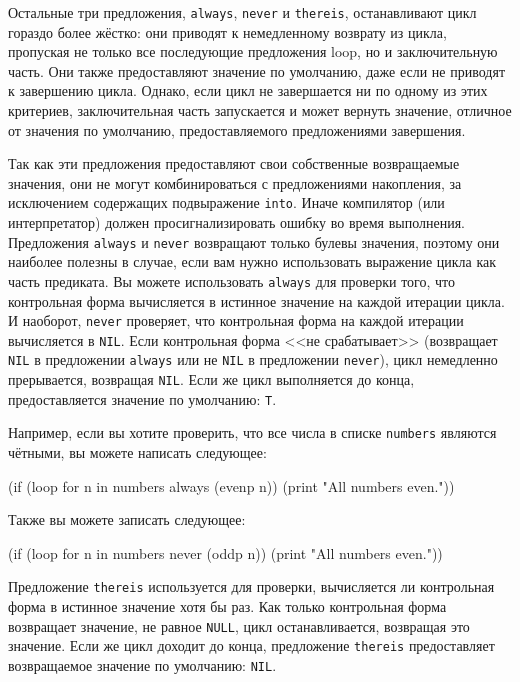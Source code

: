 Остальные три предложения, \lstinline{always}, \lstinline{never} и \lstinline{thereis}, останавливают
цикл гораздо более жёстко: они приводят к немедленному возврату из цикла, пропуская не
только все последующие предложения loop, но и заключительную часть. Они также
предоставляют значение по умолчанию, даже если не приводят к завершению цикла. Однако, если
цикл не завершается ни по одному из этих критериев, заключительная часть запускается и
может вернуть значение, отличное от значения по умолчанию, предоставляемого предложениями
завершения.

Так как эти предложения предоставляют свои собственные возвращаемые значения, они не могут
комбинироваться с предложениями накопления, за исключением содержащих подвыражение
\lstinline{into}. Иначе компилятор (или интерпретатор) должен просигнализировать ошибку во
время выполнения. Предложения \lstinline{always} и \lstinline{never} возвращают только булевы
значения, поэтому они наиболее полезны в случае, если вам нужно использовать выражение
цикла как часть предиката. Вы можете использовать \lstinline{always} для проверки того, что
контрольная форма вычисляется в истинное значение на каждой итерации цикла. И наоборот,
\lstinline{never} проверяет, что контрольная форма на каждой итерации вычисляется в
\lstinline{NIL}. Если контрольная форма <<не срабатывает>> (возвращает \lstinline{NIL} в
предложении \lstinline{always} или не \lstinline{NIL} в предложении \lstinline{never}), цикл немедленно
прерывается, возвращая \lstinline{NIL}. Если же цикл выполняется до конца, предоставляется
значение по умолчанию: \lstinline{T}.

Например, если вы хотите проверить, что все числа в списке \lstinline{numbers} являются
чётными, вы можете написать следующее:

\begin{myverb}
(if (loop for n in numbers always (evenp n))
    (print "All numbers even."))
\end{myverb}

Также вы можете записать следующее:

\begin{myverb}
(if (loop for n in numbers never (oddp n))
    (print "All numbers even."))
\end{myverb}

Предложение \lstinline{thereis} используется для проверки, вычисляется ли контрольная форма в
истинное значение хотя бы раз. Как только контрольная форма возвращает значение, не равное
\lstinline{NULL}, цикл останавливается, возвращая это значение. Если же цикл доходит до
конца, предложение \lstinline{thereis} предоставляет возвращаемое значение по умолчанию:
\lstinline{NIL}.

